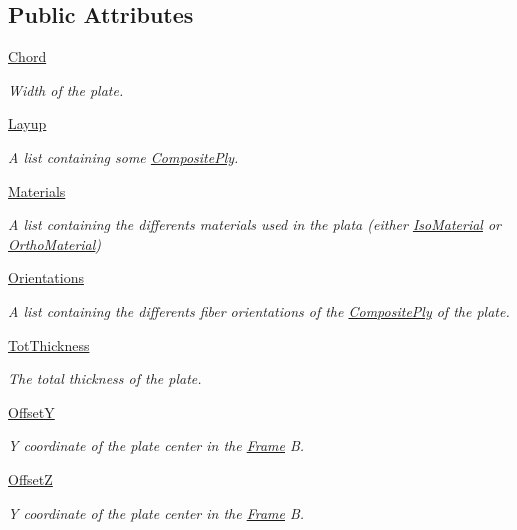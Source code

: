 \subsection*{Public Attributes}
\begin{DoxyCompactItemize}
\item 
\hyperlink{classgebtaero_1_1_composite_plate_1_1_composite_plate_a60ae01b006e99e542c3759058e82e4cb}{Chord}
\begin{DoxyCompactList}\small\item\em Width of the plate. \end{DoxyCompactList}\item 
\hyperlink{classgebtaero_1_1_composite_plate_1_1_composite_plate_a2e4f4c60f4fa09f7fc9f08e14fce4319}{Layup}
\begin{DoxyCompactList}\small\item\em A list containing some \hyperlink{namespacegebtaero_1_1_composite_ply}{Composite\+Ply}. \end{DoxyCompactList}\item 
\hyperlink{classgebtaero_1_1_composite_plate_1_1_composite_plate_a95f58eff2cdd77c45ccdca936c37c12a}{Materials}
\begin{DoxyCompactList}\small\item\em A list containing the differents materials used in the plata (either \hyperlink{namespacegebtaero_1_1_iso_material}{Iso\+Material} or \hyperlink{namespacegebtaero_1_1_ortho_material}{Ortho\+Material}) \end{DoxyCompactList}\item 
\hyperlink{classgebtaero_1_1_composite_plate_1_1_composite_plate_a4eb3337faccb863b8dc5fe5a9f781dc2}{Orientations}
\begin{DoxyCompactList}\small\item\em A list containing the differents fiber orientations of the \hyperlink{namespacegebtaero_1_1_composite_ply}{Composite\+Ply} of the plate. \end{DoxyCompactList}\item 
\hyperlink{classgebtaero_1_1_composite_plate_1_1_composite_plate_ad0af7183e0e49cba1a3a9ad8e794e311}{Tot\+Thickness}
\begin{DoxyCompactList}\small\item\em The total thickness of the plate. \end{DoxyCompactList}\item 
\hyperlink{classgebtaero_1_1_composite_plate_1_1_composite_plate_a33de8af0e1aaff88563310459b3b6f6b}{OffsetY}
\begin{DoxyCompactList}\small\item\em Y coordinate of the plate center in the \hyperlink{namespacegebtaero_1_1_frame}{Frame} B. \end{DoxyCompactList}\item 
\hyperlink{classgebtaero_1_1_composite_plate_1_1_composite_plate_aaf910e794c2f390a539b41a90dd30c83}{OffsetZ}
\begin{DoxyCompactList}\small\item\em Y coordinate of the plate center in the \hyperlink{namespacegebtaero_1_1_frame}{Frame} B. \end{DoxyCompactList}\end{DoxyCompactItemize}


